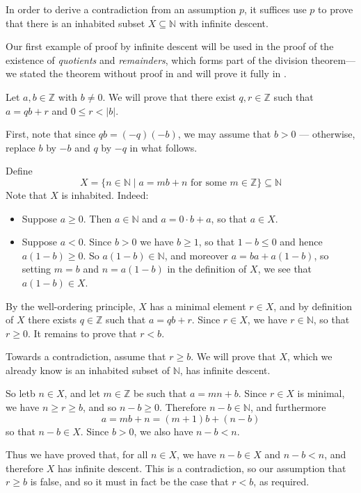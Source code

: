 \begin{strategy}
\label{strInfiniteDescent}
In order to derive a contradiction from an assumption $p$, it suffices use $p$ to prove that there is an inhabited subset $X \subseteq \mathbb{N}$ with infinite descent.
\end{strategy}

Our first example of proof by infinite descent will be used in the proof of the existence of \textit{quotients} and \textit{remainders}, which forms part of the division theorem---we stated the theorem without proof in  and will prove it fully in .

\begin{example}
\label{exQuotientRemainderExistence}
Let $a,b \in \mathbb{Z}$ with $b \ne 0$. We will prove that there exist $q,r \in \mathbb{Z}$ such that $a=qb+r$ and $0 \le r < |b|$.

First, note that since $qb = (-q)(-b)$, we may assume that $b>0$ --- otherwise, replace $b$ by $-b$ and $q$ by $-q$ in what follows.

Define
\[ X = \{ n \in \mathbb{N} \mid a = mb + n \text{ for some } m \in \mathbb{Z} \} \subseteq \mathbb{N} \]
Note that $X$ is inhabited. Indeed:
\begin{itemize}
\item Suppose $a \ge 0$. Then $a \in \mathbb{N}$ and $a = 0 \cdot b + a$, so that $a \in X$.
\item Suppose $a < 0$. Since $b>0$ we have $b \ge 1$, so that $1-b \le 0$ and hence $a(1-b) \ge 0$. So $a(1-b) \in \mathbb{N}$, and moreover $a = ba + a(1-b)$, so setting $m=b$ and $n=a(1-b)$ in the definition of $X$, we see that $a(1-b) \in X$.
\end{itemize}
By the well-ordering principle, $X$ has a minimal element $r \in X$, and by definition of $X$ there exists $q \in \mathbb{Z}$ such that $a=qb+r$. Since $r \in X$, we have $r \in \mathbb{N}$, so that $r \ge 0$. It remains to prove that $r<b$.

Towards a contradiction, assume that $r \ge b$. We will prove that $X$, which we already know is an inhabited subset of $\mathbb{N}$, has infinite descent.

So letb $n \in X$, and let $m \in \mathbb{Z}$ be such that $a=mn+b$. Since $r \in X$ is minimal, we have $n \ge r \ge b$, and so $n-b \ge 0$. Therefore $n-b \in \mathbb{N}$, and furthermore
\[ a = mb + n = (m+1)b + (n-b) \]
so that $n-b \in X$. Since $b>0$, we also have $n-b < n$.

Thus we have proved that, for all $n \in X$, we have $n-b \in X$ and $n-b < n$, and therefore $X$ has infinite descent. This is a contradiction, so our assumption that $r \ge b$ is false, and so it must in fact be the case that $r<b$, as required.
\end{example}


